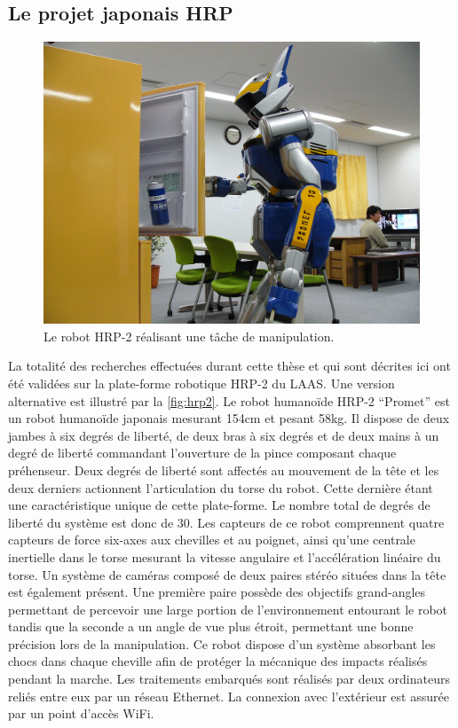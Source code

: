 \subsection{Le projet japonais HRP}


\begin{figure}
  \begin{center}
    \includegraphics[width=\linewidth]{src/chap0-introduction/hrp2.jpg}
  \end{center}
  \caption{Le robot HRP-2 réalisant une tâche de
    manipulation. \label{fig:hrp2}}
\end{figure}


La totalité des recherches effectuées durant cette thèse et qui sont
décrites ici ont été validées sur la plate-forme robotique HRP-2
\citep{1307969} du LAAS. Une version alternative est illustré par la
\autoref{fig:hrp2}. Le robot humanoïde HRP-2 ``Promet'' est un robot
humanoïde japonais mesurant 154cm et pesant 58kg. Il dispose de deux
jambes à six degrés de liberté, de deux bras à six degrés et de deux
mains à un degré de liberté commandant l'ouverture de la pince
composant chaque préhenseur. Deux degrés de liberté sont affectés au
mouvement de la tête et les deux derniers actionnent l'articulation du
torse du robot. Cette dernière étant une caractéristique unique de
cette plate-forme. Le nombre total de degrés de liberté du système est
donc de 30. Les capteurs de ce robot comprennent quatre capteurs de
force six-axes aux chevilles et au poignet, ainsi qu'une centrale
inertielle dans le torse mesurant la vitesse angulaire et
l'accélération linéaire du torse. Un système de caméras composé de
deux paires stéréo situées dans la tête est également présent. Une
première paire possède des objectifs grand-angles permettant de
percevoir une large portion de l'environnement entourant le robot
tandis que la seconde a un angle de vue plus étroit, permettant une
bonne précision lors de la manipulation. Ce robot dispose d'un système
absorbant les chocs dans chaque cheville afin de protéger la mécanique
des impacts réalisés pendant la marche. Les traitements embarqués sont
réalisés par deux ordinateurs reliés entre eux par un réseau
Ethernet. La connexion avec l'extérieur est assurée par un point
d'accès WiFi.


